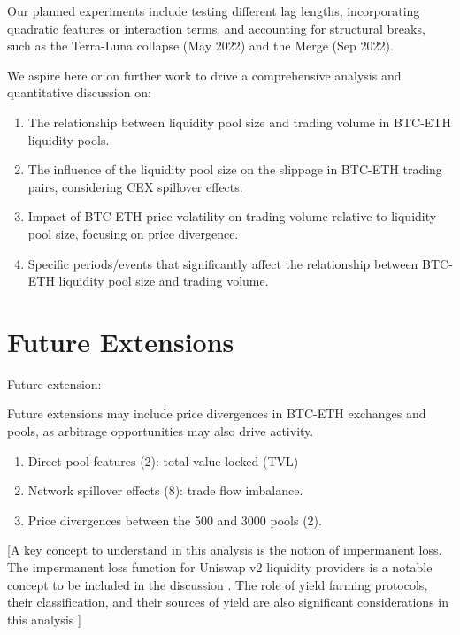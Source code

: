 \documentclass{article}
\begin{document}
Our planned experiments include testing different lag lengths, incorporating quadratic features or interaction terms, and accounting for structural breaks, such as the Terra-Luna collapse (May 2022) and the Merge (Sep 2022).

We aspire here or on further work to drive a comprehensive analysis and quantitative discussion on:

\begin{enumerate}[itemsep=0pt, topsep=0pt]
\item The relationship between liquidity pool size and trading volume in BTC-ETH liquidity pools.
\item The influence of the liquidity pool size on the slippage in BTC-ETH trading pairs, considering CEX spillover effects.
\item Impact of BTC-ETH price volatility on trading volume relative to liquidity pool size, focusing on price divergence.
\item Specific periods/events that significantly affect the relationship between BTC-ETH liquidity pool size and trading volume.
\end{enumerate}



\section*{\textbf{Future Extensions}}
Future extension:

Future extensions may include price divergences in BTC-ETH exchanges and pools, as arbitrage opportunities may also drive activity.

\begin{enumerate}[label=\arabic*. ,itemsep=0pt, topsep=0pt]
\item Direct pool features (2): total value locked (TVL)
\item Network spillover effects (8): trade flow imbalance.
\item Price divergences between the 500 and 3000 pools (2).
\end{enumerate}

[A key concept to understand in this analysis is the notion of impermanent loss. The impermanent loss function for Uniswap v2 liquidity providers is a notable concept to be included in the discussion \cite{impermanentloss2023}. The role of yield farming protocols, their classification, and their sources of yield are also significant considerations in this analysis \cite{yield_farming_protocols}]
\end{document}
